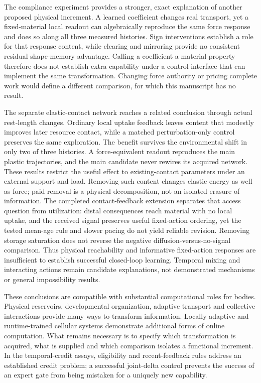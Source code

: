 The compliance experiment provides a stronger, exact explanation of another proposed physical increment. A learned coefficient changes real transport, yet a fixed-material local readout can algebraically reproduce the same force response and does so along all three measured histories. Sign interventions establish a role for that response content, while clearing and mirroring provide no consistent residual shape-memory advantage. Calling a coefficient a material property therefore does not establish extra capability under a control interface that can implement the same transformation. Changing force authority or pricing complete work would define a different comparison, for which this manuscript has no result.

The separate elastic-contact network reaches a related conclusion through actual rest-length changes. Ordinary local uptake feedback leaves content that modestly improves later resource contact, while a matched perturbation-only control preserves the same exploration. The benefit survives the environmental shift in only two of three histories. A force-equivalent readout reproduces the main plastic trajectories, and the main candidate never rewires its acquired network. These results restrict the useful effect to existing-contact parameters under an external support and load. Removing such content changes elastic energy as well as force; paid removal is a physical decomposition, not an isolated erasure of information. The completed contact-feedback extension separates that access question from utilization: distal consequences reach material with no local uptake, and the received signal preserves useful fixed-action ordering, yet the tested mean-age rule and slower pacing do not yield reliable revision. Removing storage saturation does not reverse the negative diffusion-versus-no-signal comparison. Thus physical reachability and informative fixed-action responses are insufficient to establish successful closed-loop learning. Temporal mixing and interacting actions remain candidate explanations, not demonstrated mechanisms or general impossibility results.

These conclusions are compatible with substantial computational roles for bodies. Physical reservoirs, developmental organization, adaptive transport and collective interactions provide many ways to transform information\cite{nakajima2015,developmental,tero,colizzi}. Locally adaptive and runtime-trained cellular systems demonstrate additional forms of online computation\cite{khajehabdollahi,pdnca}. What remains necessary is to specify which transformation is acquired, what is supplied and which comparison isolates a functional increment. In the temporal-credit assays, eligibility and recent-feedback rules address an established credit problem\cite{florian,izhikevich,fremaux}; a successful joint-delta control prevents the success of an expert gate from being mistaken for a uniquely new capability.


